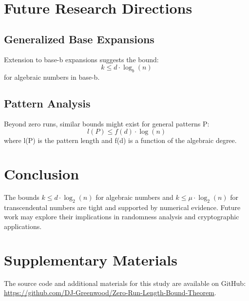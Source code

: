 \section{Future Research Directions}

\subsection{Generalized Base Expansions}
Extension to base-b expansions suggests the bound:
\begin{equation}
    k \leq d \cdot \log_b(n)
\end{equation}
for algebraic numbers in base-b.

\subsection{Pattern Analysis}
Beyond zero runs, similar bounds might exist for general patterns P:
\begin{equation}
    l(P) \leq f(d) \cdot \log(n)
\end{equation}
where l(P) is the pattern length and f(d) is a function of the algebraic degree.

\section{Conclusion}
The bounds $k \leq d \cdot \log_2(n)$ for algebraic numbers and $k \leq \mu \cdot \log_2(n)$ for transcendental
numbers are tight and supported by numerical evidence. Future work may explore their
implications in randomness analysis and cryptographic applications.

\section{Supplementary Materials}
The source code and additional materials for this study are available on \newline GitHub: \url{ 
https://github.com/DJ-Greenwood/Zero-Run-Length-Bound-Theorem}.

